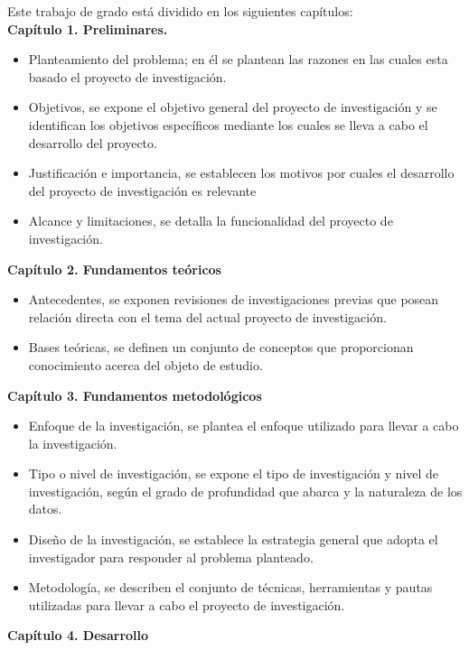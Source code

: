 Este  trabajo de grado está dividido en los siguientes capítulos:\\

\noindent
\textbf{Capítulo 1. Preliminares. }
\begin{itemize}
\item {Planteamiento del problema; en él se plantean las razones en las cuales esta basado el proyecto de investigación.}
\item {Objetivos, se expone el objetivo general del proyecto de investigación y se identifican los objetivos específicos mediante los cuales se lleva a cabo el desarrollo del proyecto.}
\item {Justificación e importancia, se establecen los motivos por cuales el desarrollo del proyecto de investigación es relevante}
\item {Alcance y limitaciones, se detalla la funcionalidad del proyecto de investigación.}
\end{itemize}
\textbf{Capítulo 2. Fundamentos teóricos}
\begin{itemize}
\item {Antecedentes, se exponen revisiones de investigaciones previas que posean relación directa con el tema del actual proyecto de investigación.}
\item {Bases teóricas, se definen un conjunto de conceptos que proporcionan conocimiento acerca del objeto de estudio.}
\end{itemize}
\textbf{Capítulo 3. Fundamentos metodológicos}
\begin{itemize}
\item {Enfoque de la investigación, se plantea el enfoque utilizado para llevar a cabo la investigación.}
\item {Tipo o nivel de investigación, se expone el tipo de investigación y nivel de investigación, según el grado de profundidad que abarca y la naturaleza de los datos.}
\item {Diseño de la investigación, se establece la estrategia general que adopta el investigador para responder al problema planteado.}
\item {Metodología, se describen el conjunto de técnicas, herramientas y pautas utilizadas para llevar a cabo el proyecto de investigación.}
\end{itemize}
\textbf{Capítulo 4. Desarrollo}
